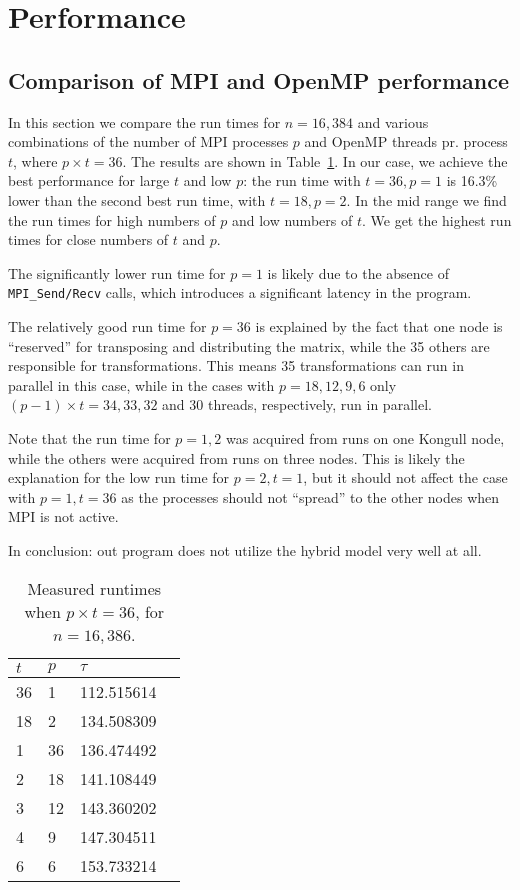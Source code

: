 \section{Performance} %
\label{sec:performance}

\subsection{Comparison of MPI and OpenMP performance} %
\label{sub:comparison_of_mpi_and_openmp_performance}
In this section we compare the run times for $n=16,384$ and various combinations of the number of MPI processes $p$ and OpenMP threads pr. process $t$, where $p\times t = 36$. The results are shown in Table~\ref{tab:runtimes_36}. In our case, we achieve the best performance for large $t$ and low $p$: the run time with $t=36, p=1$ is 16.3\% lower than the second best run time, with $t=18, p=2$. In the mid range we find the run times for high numbers of $p$ and low numbers of $t$. We get the highest run times for close numbers of $t$ and $p$.

The significantly lower run time for $p=1$ is likely due to the absence of \texttt{MPI\_Send/Recv} calls, which introduces a significant latency in the program.

The relatively good run time for $p=36$ is explained by the fact that one node is ``reserved'' for transposing and distributing the matrix, while the 35 others are responsible for transformations. This means 35 transformations can run in parallel in this case, while in the cases with $p=18,12,9,6$ only $(p-1)\times t = 34, 33, 32$ and $30$ threads, respectively, run in parallel.

Note that the run time for $p=1,2$ was acquired from runs on one Kongull node, while the others were acquired from runs on three nodes. This is likely the explanation for the low run time for $p=2, t=1$, but it should not affect the case with $p=1,t=36$ as the processes should not ``spread'' to the other nodes when MPI is not active.

In conclusion: out program does not utilize the hybrid model very well at all.

\begin{table}[H]
  \centering
  \caption{Measured runtimes when $p\times t = 36$, for $n=16,386$.}
  \label{tab:runtimes_36}
  \begin{tabularx}{0.5\textwidth}{XXXX}
    \toprule
    $t$ & $p$ & $\tau$ \\
    \midrule
    36  &  1  &  112.515614 \\
    18  &  2  &  134.508309 \\
    1   & 36  &  136.474492 \\
    2   & 18  &  141.108449 \\
    3   & 12  &  143.360202 \\
    4   &  9  &  147.304511 \\
    6   &  6  &  153.733214 \\
    \bottomrule
  \end{tabularx}
\end{table}

